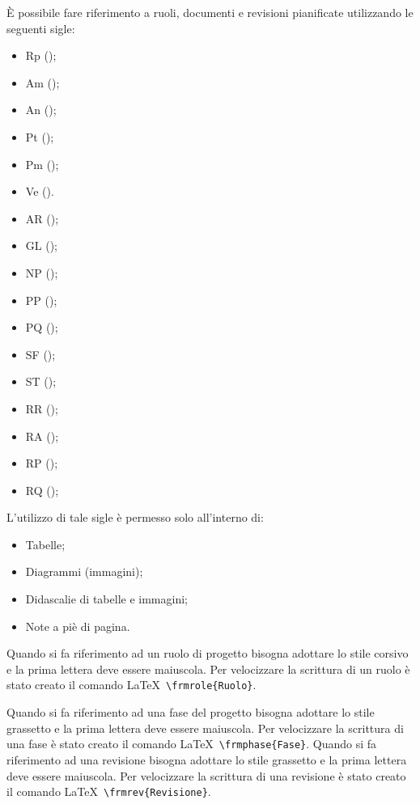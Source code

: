 \documentclass[../NormeProgetto.tex]{subfiles}
\begin{document}
			È possibile fare riferimento a ruoli, documenti e revisioni pianificate utilizzando le seguenti sigle:
			\begin{itemize}
				\item Rp (\responsabilediprogetto);
				\item Am (\amministratore);
				\item An (\analista);
				\item Pt (\progettista);
				\item Pm (\programmatore);
				\item Ve (\verificatore).
				
				\item AR (\analisideirequisiti);
				\item GL (\glossario);
				\item NP (\normediprogetto);
				\item PP (\pianodiprogetto);
				\item PQ (\pianodiqualifica);
				\item SF (\studiodifattibilita);
				\item ST (\specificatecnica);
				
				\item RR (\revisionedeirequisiti);
				\item RA (\revisionediaccettazione);
				\item RP (\revisionediprogettazione);
				\item RQ (\revisionediqualifica);
			\end{itemize}
			L'utilizzo di tale sigle è permesso solo all'interno di:
			\begin{itemize}
				\item Tabelle;
				\item Diagrammi (immagini);
				\item Didascalie di tabelle e immagini;
				\item Note a piè di pagina.
			\end{itemize}
			Quando si fa riferimento ad un ruolo di progetto bisogna adottare lo stile corsivo e la prima lettera deve essere maiuscola. 	 Per velocizzare la scrittura di un ruolo è stato creato il comando \LaTeX\ \texttt{\textbackslash frmrole\{Ruolo\}}. 
			
			Quando si fa riferimento ad una fase del progetto bisogna adottare lo stile grassetto e la prima lettera deve essere maiuscola.	 Per velocizzare la scrittura di una fase è stato creato il comando \LaTeX\ \texttt{\textbackslash frmphase\{Fase\}}. 
			Quando si fa riferimento ad una revisione bisogna adottare lo stile grassetto e la prima lettera deve essere maiuscola. Per velocizzare la scrittura di una revisione è stato creato il comando \LaTeX\ \texttt{\textbackslash frmrev\{Revisione\}}.
			
\end{document}
